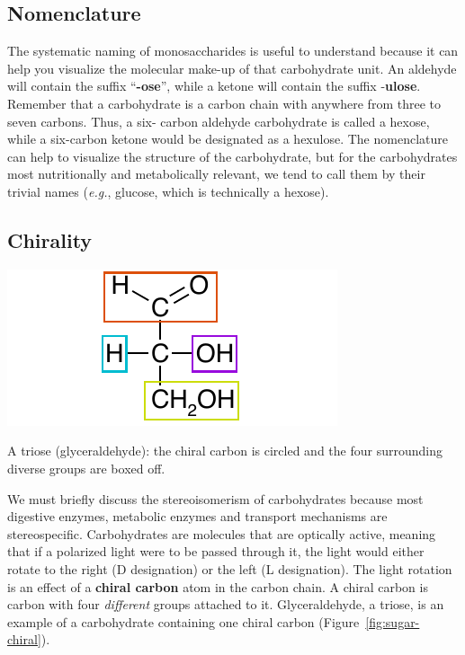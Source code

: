 \documentclass{tufte-handout}
\begin{document}
\subsection{Nomenclature}

The systematic naming of monosaccharides is useful to understand because it can help you visualize the molecular make-up of that carbohydrate unit. An aldehyde will contain the suffix ``\textbf{-ose}'', while a ketone will contain the suffix -\textbf{ulose}. Remember that a carbohydrate is a carbon chain with anywhere from three to seven carbons. Thus, a six- carbon aldehyde carbohydrate is called a hexose, while a six-carbon ketone would be designated as a hexulose. The nomenclature can help to visualize the structure of the carbohydrate, but for the carbohydrates most nutritionally and metabolically relevant, we tend to call them by their trivial names (\textit{e.g.}, glucose, which is technically a hexose).

\subsection{Chirality}

\begin{marginfigure}
\includegraphics{figures/sugar-chiral.pdf}
\caption{A triose (glyceraldehyde): the chiral carbon is circled and the four surrounding diverse groups are boxed off.}\label{fig:sugar-chiral}
\end{marginfigure}

We must briefly discuss the stereoisomerism of carbohydrates because most digestive enzymes, metabolic enzymes and transport mechanisms are stereospecific. Carbohydrates are molecules that are optically active, meaning that if a polarized light were to be passed through it, the
light would either rotate to the right (D designation) or the left (L designation). The light rotation is an effect of a \textbf{chiral
carbon} atom in the carbon chain. A chiral carbon is carbon with four \emph{different} groups attached to it.  Glyceraldehyde, a triose, is an example of a carbohydrate containing one chiral carbon (Figure~\ref{fig:sugar-chiral}).
\end{document}

